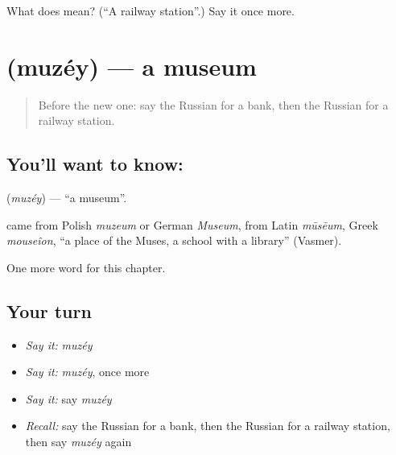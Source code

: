 \begin{tcolorbox}[breakable,colback=teal!4,colframe=teal!35!black,title={Before you move on}]
What does  mean? (\textquotedblleft{}A railway station\textquotedblright{}.) Say it once more.
\end{tcolorbox}
\section[\texorpdfstring{\ru{музей} (muzéy)}{музей (muzéy)}]{ (muzéy) — a museum}

\label{lesson:RU-C78-museum}



\begin{quote}
Before the new one: say the Russian for a bank, then the Russian for a railway station.
\end{quote}

\subsection*{You'll want to know: }
\textbf{} (\emph{muzéy}) — \textquotedblleft{}a museum\textquotedblright{}.

\begin{cousinweb}
\textbf{} came from Polish \emph{muzeum} or German \emph{Museum}, from Latin \emph{mūsēum}, Greek \emph{mouseîon}, \textquotedblleft{}a place of the Muses, a school with a library\textquotedblright{} (Vasmer).
\end{cousinweb}

\begin{grammarlens}[title={What you've built}]
One more word for this chapter.
\end{grammarlens}

\subsection*{Your turn}
\begin{itemize}
\raggedright
  \item \emph{Say it:} \emph{muzéy}
  \item \emph{Say it:} \emph{muzéy}, once more
  \item \emph{Say it:} say \emph{muzéy}
  \item \emph{Recall:} say the Russian for a bank, then the Russian for a railway station, then say \emph{muzéy} again
\end{itemize}

